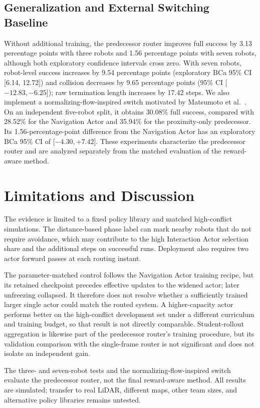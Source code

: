 \documentclass[letterpaper,10pt,conference]{ieeeconf}
\begin{document}
\subsection{Generalization and External Switching Baseline}
Without additional training, the predecessor router improves full success by 3.13 percentage points with three robots and 1.56 percentage points with seven robots, although both exploratory confidence intervals cross zero. With seven robots, robot-level success increases by 9.54 percentage points (exploratory BCa 95\% CI [6.14, 12.72]) and collision decreases by 9.65 percentage points (95\% CI [$-12.83,-6.25$]); raw termination length increases by 17.42 steps. We also implement a normalizing-flow-inspired switch motivated by Matsumoto et al.~\cite{matsumoto2024flow}. On an independent five-robot split, it obtains 30.08\% full success, compared with 28.52\% for the Navigation Actor and 35.94\% for the proximity-only predecessor. Its 1.56-percentage-point difference from the Navigation Actor has an exploratory BCa 95\% CI of [$-4.30,+7.42$]. These experiments characterize the predecessor router and are analyzed separately from the matched evaluation of the reward-aware method.

\section{Limitations and Discussion}
The evidence is limited to a fixed policy library and matched high-conflict simulations. The distance-based phase label can mark nearby robots that do not require avoidance, which may contribute to the high Interaction Actor selection share and the additional steps on successful runs. Deployment also requires two actor forward passes at each routing instant.

The parameter-matched control follows the Navigation Actor training recipe, but its retained checkpoint precedes effective updates to the widened actor; later unfreezing collapsed. It therefore does not resolve whether a sufficiently trained larger single actor could match the routed system. A higher-capacity actor performs better on the high-conflict development set under a different curriculum and training budget, so that result is not directly comparable. Student-rollout aggregation is likewise part of the predecessor router's training procedure, but its validation comparison with the single-frame router is not significant and does not isolate an independent gain.

The three- and seven-robot tests and the normalizing-flow-inspired switch evaluate the predecessor router, not the final reward-aware method. All results are simulated; transfer to real LiDAR, different maps, other team sizes, and alternative policy libraries remains untested.
\end{document}
